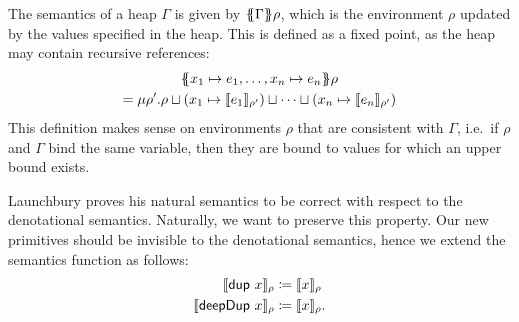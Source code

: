 \documentclass[preprint]{sigplanconf}
\theoremstyle{nonumberplain}
\begin{document}
The semantics of a heap $\Gamma$ is given by $\{\!\!\{\Gamma\}\!\!\} \rho$, which is the environment $\rho$ updated by the values specified in the heap. This is defined as a fixed point, as the heap may contain recursive references:
\begin{multline*}
\{\!\!\{ x_1\mapsto e_1,\ldots,x_n\mapsto e_n\}\!\!\}\rho \\
= \mu \rho'. \rho \sqcup (x_1 \mapsto \llbracket e_1 \rrbracket_{\rho'}) \sqcup \cdots \sqcup (x_n \mapsto \llbracket e_n \rrbracket_{\rho'})
\end{multline*}
This definition makes sense on environments $\rho$ that are consistent with $\Gamma$, i.e.\ if $\rho$ and $\Gamma$ bind the same variable, then they are bound to values for which an upper bound exists.

Launchbury proves his natural semantics to be correct with respect to the denotational semantics. 
Naturally, we want to preserve this property. Our new primitives should be invisible to the denotational semantics, hence we extend the semantics function as follows:
\begin{align*}
\llbracket \text{\textsf{dup}}\ x \rrbracket_{\rho} &\coloneqq \llbracket x \rrbracket_{\rho} \\
\llbracket \text{\textsf{deepDup}}\ x \rrbracket_{\rho} &\coloneqq \llbracket x \rrbracket_{\rho}.
\end{align*}
\end{document}
